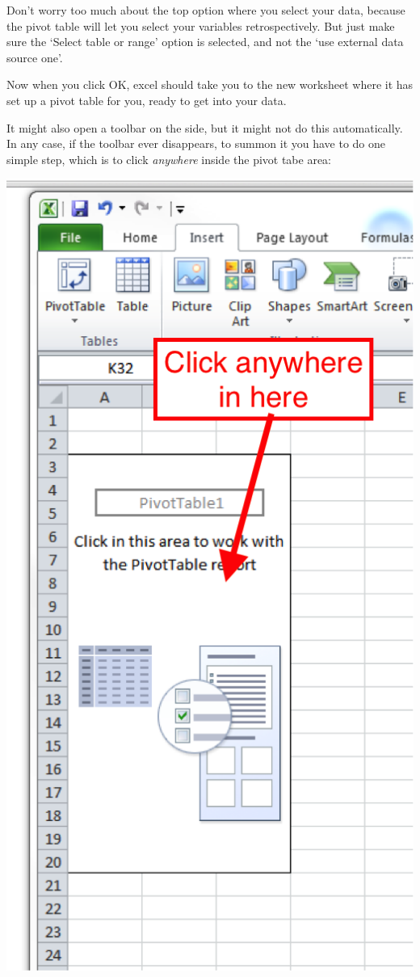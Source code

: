 \documentclass[
]{book}
\begin{document}
Don't worry too much about the top option where you select your data, because the pivot table will let you select your variables retrospectively. But just make sure the `Select table or range' option is selected, and not the `use external data source one'.

Now when you click OK, excel should take you to the new worksheet where it has set up a pivot table for you, ready to get into your data.

It might also open a toolbar on the side, but it might not do this automatically. In any case, if the toolbar ever disappears, to summon it you have to do one simple step, which is to click \emph{anywhere} inside the pivot tabe area:

\includegraphics{imgs/pivot_shell.png}
\end{document}
